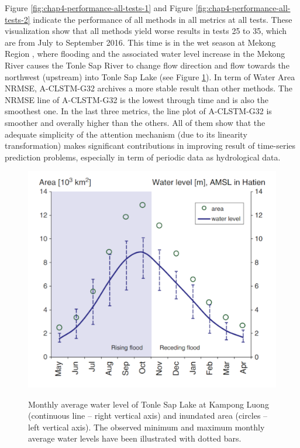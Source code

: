 Figure \ref{fig:chap4-performance-all-tests-1} and Figure \ref{fig:chap4-performance-all-tests-2} indicate the performance of all methods in all metrics at all tests. These visualization show that all methods yield worse results in tests 25 to 35, which are from July to September 2016. This time is in the wet season at Mekong Region \cite{article:Water-balance-analysis-TonleSap}, where flooding and the associated water level increase in the Mekong River causes the Tonle Sap River to change flow direction and flow towards the northwest (upstream) into Tonle Sap Lake (see Figure \ref{fig:chap4-tonlesap-avg-area}). In term of Water Area NRMSE, A-CLSTM-G32 archives a more stable result than other methods. The NRMSE line of A-CLSTM-G32 is the lowest through time and is also the smoothest one. In the last three metrics, the line plot of A-CLSTM-G32 is smoother and overally higher than the others. All of them show that the adequate simplicity of the attention mechanism (due to its linearity transformation) makes significant contributions in improving result of time-series prediction problems, especially in term of periodic data as hydrological data.

\begin{figure}
    \caption{Monthly average water level of Tonle Sap Lake at Kampong Luong (continuous line – right vertical axis) and inundated area (circles – left vertical axis). The observed minimum and maximum monthly average water levels have been illustrated with dotted bars.}
    \includegraphics[width=.6\textwidth]{figures/chap4/tonlesap_avg_area_with_floodplain.png} \cite{article:Water-balance-analysis-TonleSap}
    \label{fig:chap4-tonlesap-avg-area}
\end{figure}



